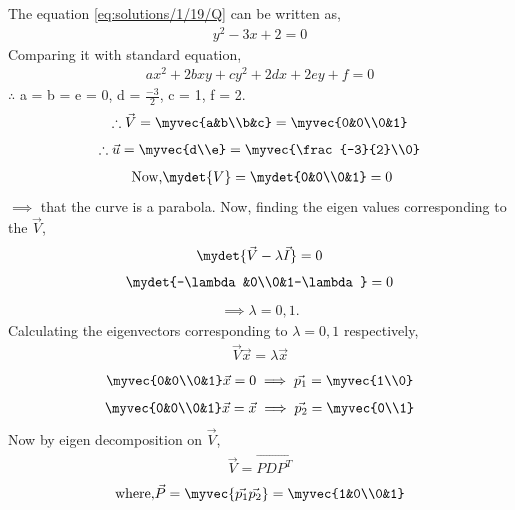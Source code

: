 The equation \eqref{eq:solutions/1/19/Q} can be written as,
\begin{align}
y^2-3x+2 = 0
\end{align}
Comparing it with standard equation,
\begin{align}
ax^2+2bxy+cy^2+2dx+2ey+f = 0
\end{align}
$\therefore$ a = b = e = 0, d = $\frac{-3}{2}$, c = 1, f = 2.
\begin{align}
\therefore \vec{V} = \myvec{a&b\\b&c} = \myvec{0&0\\0&1}
\end{align} 
\begin{align}
\therefore\vec{u} = \myvec{d\\e} = \myvec{\frac{-3}{2}\\0}\label{eq:solutions/1/19/u}
\end{align}
\begin{align}
 \mbox{ Now,} \mydet{V} = \mydet{0&0\\0&1} = 0
\end{align}
$\implies$ that the curve is a parabola. Now, finding the eigen values corresponding to the $\vec{V}$,
\begin{align}
\mydet{\vec{V}-\lambda\vec{I}} = 0
\end{align}
\begin{align}
\mydet{-\lambda&0\\0&1-\lambda} = 0
\end{align}
\begin{align}
\implies \lambda = 0,1.
\end{align}
Calculating the eigenvectors corresponding to $\lambda = 0,1$ respectively,
\begin{align}
\vec{V}\vec{x} = \lambda\vec{x}
\end{align}
\begin{align}
\myvec{0&0\\0&1}\vec{x} = 0 \implies \vec{p_1} = \myvec{1\\0}
\end{align}
\begin{align}
\myvec{0&0\\0&1}\vec{x} = \vec{x} \implies \vec{p_2} = \myvec{0\\1}
\end{align}
Now by eigen decomposition on $\vec{V}$,
\begin{align}
\vec{V} = \vec{PDP^T}
\label{eq:solutions/1/19/V}
\end{align}
\begin{align}
\mbox{where,} \vec{P} = \myvec{\vec{p_1} \vec{p_2}} = \myvec{1&0\\0&1}
\end{align}

